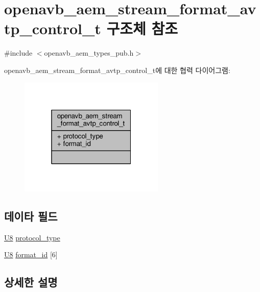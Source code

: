 \hypertarget{structopenavb__aem__stream__format__avtp__control__t}{}\section{openavb\+\_\+aem\+\_\+stream\+\_\+format\+\_\+avtp\+\_\+control\+\_\+t 구조체 참조}
\label{structopenavb__aem__stream__format__avtp__control__t}


{\ttfamily \#include $<$openavb\+\_\+aem\+\_\+types\+\_\+pub.\+h$>$}



openavb\+\_\+aem\+\_\+stream\+\_\+format\+\_\+avtp\+\_\+control\+\_\+t에 대한 협력 다이어그램\+:
\nopagebreak
\begin{figure}[H]
\begin{center}
\leavevmode
\includegraphics[width=196pt]{structopenavb__aem__stream__format__avtp__control__t__coll__graph}
\end{center}
\end{figure}
\subsection*{데이타 필드}
\begin{DoxyCompactItemize}
\item 
\hyperlink{openavb__types__base__pub_8h_aa63ef7b996d5487ce35a5a66601f3e73}{U8} \hyperlink{structopenavb__aem__stream__format__avtp__control__t_af5a53e85f700bf2bed8a66c37a52e208}{protocol\+\_\+type}
\item 
\hyperlink{openavb__types__base__pub_8h_aa63ef7b996d5487ce35a5a66601f3e73}{U8} \hyperlink{structopenavb__aem__stream__format__avtp__control__t_ae1ff7c8bfecfa86c9ab47966bf21d53e}{format\+\_\+id} \mbox{[}6\mbox{]}
\end{DoxyCompactItemize}


\subsection{상세한 설명}


